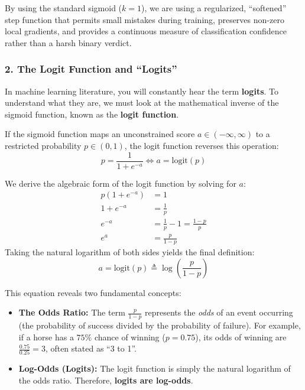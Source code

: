 \documentclass{article}
\begin{document}
By using the standard sigmoid ($k=1$), we are using a regularized, ``softened'' step function that permits small mistakes during training, preserves non-zero local gradients, and provides a continuous measure of classification confidence rather than a harsh binary verdict.

\subsubsection*{2. The Logit Function and ``Logits''}
In machine learning literature, you will constantly hear the term \textbf{logits}. To understand what they are, we must look at the mathematical inverse of the sigmoid function, known as the \textbf{logit function}.

If the sigmoid function maps an unconstrained score $a \in (-\infty, \infty)$ to a restricted probability $p \in (0, 1)$, the logit function reverses this operation:
\begin{equation}
    p = \frac{1}{1 + e^{-a}} \iff a = \text{logit}(p)
\end{equation}

We derive the algebraic form of the logit function by solving for $a$:
\begin{align}
    p(1 + e^{-a}) &= 1 \\
    1 + e^{-a} &= \frac{1}{p} \\
    e^{-a} &= \frac{1}{p} - 1 = \frac{1 - p}{p} \\
    e^a &= \frac{p}{1 - p}
\end{align}
Taking the natural logarithm of both sides yields the final definition:
\begin{equation}
    a = \text{logit}(p) \triangleq \log\left(\frac{p}{1 - p}\right)
\end{equation}

\noindent This equation reveals two fundamental concepts:
\begin{itemize}
    \item \textbf{The Odds Ratio:} The term $\frac{p}{1-p}$ represents the \textit{odds} of an event occurring (the probability of success divided by the probability of failure). For example, if a horse has a $75\%$ chance of winning ($p=0.75$), its odds of winning are $\frac{0.75}{0.25} = 3$, often stated as ``3 to 1''.
    \item \textbf{Log-Odds (Logits):} The logit function is simply the natural logarithm of the odds ratio. Therefore, \textbf{logits are log-odds}.
\end{itemize}
\end{document}
